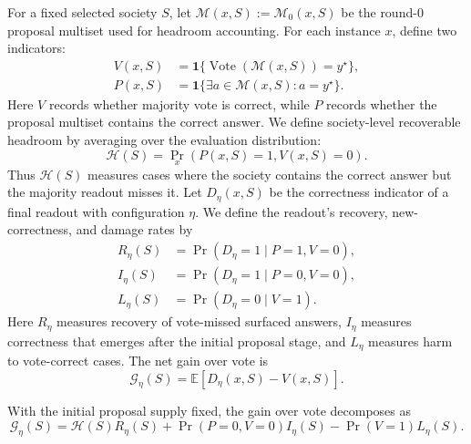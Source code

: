 For a fixed selected society $S$, let
$\mathcal M(x,S):=\mathcal M_0(x,S)$ be the round-0 proposal multiset used for
headroom accounting. For each instance $x$, define two indicators:
\begin{equation}
\begin{aligned}
    V(x,S)&=\mathbf 1\{\operatorname{Vote}(\mathcal M(x,S))=y^\star\},\\
    P(x,S)&=\mathbf 1\{\exists a\in\mathcal M(x,S):a=y^\star\}.
\end{aligned}
    \label{eq:vote_proposal_hit}
\end{equation}
Here $V$ records whether majority vote is correct, while $P$ records whether
the proposal multiset contains the correct answer. We define society-level
recoverable headroom by averaging over the evaluation distribution:
\begin{equation}
    \mathcal H(S)=\Pr_x(P(x,S)=1,V(x,S)=0).
    \label{eq:headroom}
\end{equation}
Thus $\mathcal H(S)$ measures cases where the society contains the correct
answer but the majority readout misses it.
Let $D_\eta(x,S)$ be the correctness indicator of a final readout with
configuration $\eta$. We define the readout's recovery, new-correctness, and
damage rates by
\begin{equation}
\begin{aligned}
    R_\eta(S)&=\Pr(D_\eta=1\mid P=1,V=0),\\
    I_\eta(S)&=\Pr(D_\eta=1\mid P=0,V=0),\\
    L_\eta(S)&=\Pr(D_\eta=0\mid V=1).
\end{aligned}
    \label{eq:recovery_damage}
\end{equation}
Here $R_\eta$ measures recovery of vote-missed surfaced answers, $I_\eta$
measures correctness that emerges after the initial proposal stage, and
$L_\eta$ measures harm to vote-correct cases. The net gain over vote is
\begin{equation}
    \mathcal G_\eta(S)=\mathbb E[D_\eta(x,S)-V(x,S)].
    \label{eq:gain_def}
\end{equation}
\begin{proposition}
\label{prop:recovery_damage_decomposition}
With the initial proposal supply fixed, the gain over vote decomposes as
\begin{equation}
    \mathcal G_\eta(S)
    =
    \mathcal H(S)R_\eta(S)
    +
    \Pr(P=0,V=0)I_\eta(S)
    -
    \Pr(V=1)L_\eta(S).
    \label{eq:headroom_decomposition}
\end{equation}
\end{proposition}

